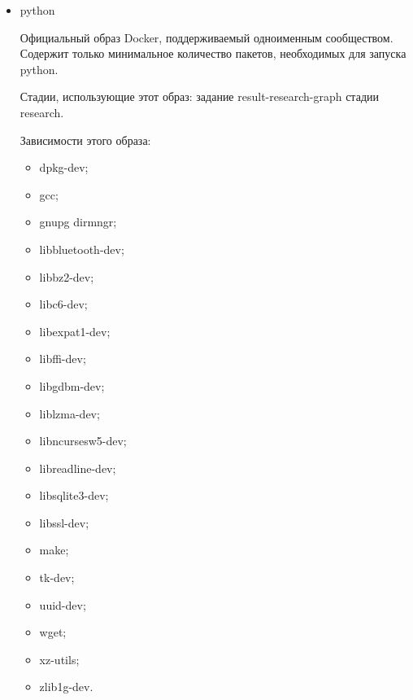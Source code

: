 \begin{itemize}
	Стадии, использующие этот образ: create\_film.
	
	Зависимости этого образа:
	\begin{itemize}
		\item automake;
		\item bzip2;
		\item cmake;
		\item diffutils;
		\item expat-devel;
		\item gcc;
		\item git;
		\item gperf;
		\item libtool;
		\item make;
		\item nasm;
		\item perl;
		\item python3;
		\item openssl-devel;
		\item tar;
		\item yasm;
		\item which;
		\item zlib-devel.
	\end{itemize}
	
	\item python
	
	Официальный образ Docker, поддерживаемый одноименным сообществом. Содержит только минимальное количество пакетов, необходимых для запуска python.
	
	Стадии, использующие этот образ: задание result-research-graph стадии research.
	
	Зависимости этого образа:
	\begin{itemize}
		\item dpkg-dev;
		\item gcc;
		\item gnupg dirmngr;
		\item libbluetooth-dev;
		\item libbz2-dev;
		\item libc6-dev;
		\item libexpat1-dev; 
		\item libffi-dev;
		\item libgdbm-dev; 
		\item liblzma-dev;
		\item libncursesw5-dev;
		\item libreadline-dev; 
		\item libsqlite3-dev; 
		\item libssl-dev;
		\item make;
		\item tk-dev;
		\item uuid-dev; 
		\item wget;
		\item xz-utils;
		\item zlib1g-dev.
	\end{itemize}
\end{itemize}

